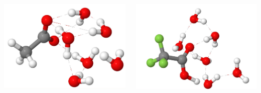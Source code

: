 \documentclass{beamer}
\begin{document}
\begin{frame}
\begin{block}{}
\begin{columns}
\pause
{}
\begin{center}
\includegraphics[scale=0.06]{figures/6water_acetate.jpg}
\end{center}

\pause
{}

\begin{center}
\includegraphics[scale=0.06]{figures/6water_trifluoro.jpg}
\end{center}
\pause
{}


\end{columns}
\end{block}
\end{frame}
\end{document}

